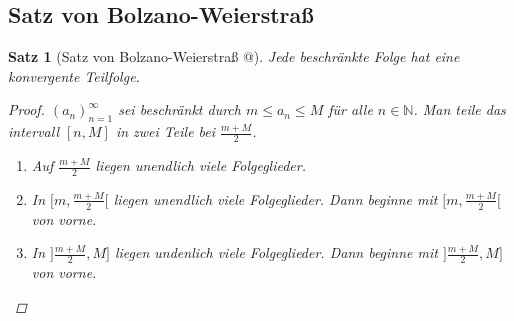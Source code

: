 \documentclass{article}
\makeatletter
\newtheorem{thm}{Satz}[section]
\newcommand*{\rom}[1]{\expandafter\@slowromancap\romannumeral #1@}
\makeatother
\begin{document}
	\subsection{Satz von Bolzano-Weierstraß}
	\begin{thm}[Satz von Bolzano-Weierstraß \rom{1}]
		Jede beschränkte Folge hat eine konvergente Teilfolge.
		
		\begin{proof} \((a_n)_{n=1}^{\infty}\) sei beschränkt durch \(m \leq a_n \leq M\) für alle \(n \in \mathbb{N}\). Man teile das intervall \([n,M]\) in zwei Teile bei \(\frac{m+M}{2}\).
			\begin{enumerate}[label=\theenumi . Fall:]
				\item Auf \(\frac{m+M}{2}\) liegen unendlich viele Folgeglieder.
				\item In \([m, \frac{m+M}{2}[\) liegen unendlich viele Folgeglieder. Dann beginne mit \([m, \frac{m+M}{2}[\) von vorne.
				\item In \(]\frac{m+M}{2}, M]\) liegen undenlich viele Folgeglieder. Dann beginne mit \(]\frac{m+M}{2}, M]\) von vorne.
			\end{enumerate}
			
		\end{proof}
	\end{thm}
	
\end{document}
